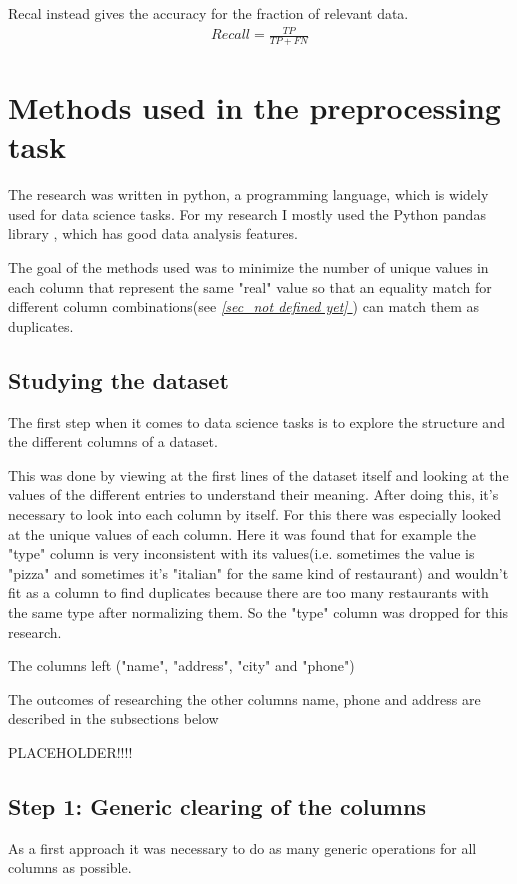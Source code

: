 \documentclass[conference]{IEEEtran}
\newcommand*{\fullref}[1]{\textit{\hyperref[{#1}]{\autoref*{#1} \nameref*{#1}}}}
\begin{document}
Recal instead gives the accuracy for the fraction of relevant data.
\begin{align}
	Recall = \frac{TP}{TP + FN}
\end{align}
\section{Methods used in the preprocessing task} \label{sec_methods}
The research was written in python, a programming language, which is widely used for data science tasks. For my research I mostly used the Python pandas library \cite{bib:pandas_doc}, which has good data analysis features. 

The goal of the methods used was to minimize the number of unique values in each column that represent the same "real" value so that an equality match for different column combinations(see \fullref{sec_not defined yet}) can match them as duplicates.
\subsection{Studying the dataset}
The first step when it comes to data science tasks is to explore the structure and the different columns of a dataset. 

This was done by viewing at the first lines of the dataset itself and looking at the values of the different entries to understand their meaning. After doing this, it's necessary to look into each column by itself. For this there was especially looked at the unique values of each column. Here it was found that for example the "type" column is very inconsistent with its values(i.e. sometimes the value is "pizza" and sometimes it's "italian" for the same kind of restaurant) and wouldn't fit as a column to find duplicates because there are too many restaurants with the same type after normalizing them. So the "type" column was dropped for this research.

The columns left ("name", "address", "city" and "phone")

The outcomes of researching the other columns name, phone and address are described in the subsections below


PLACEHOLDER!!!!









\subsection{Step 1: Generic clearing of the columns}
As a first approach it was necessary to do as many generic operations for all columns as possible. 
\end{document}
